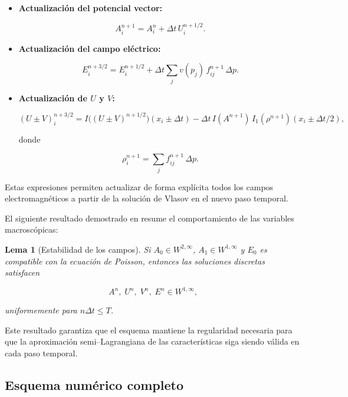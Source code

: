 \documentclass[11pt,a4paper,twoside,pdf]{article}
\numberwithin{equation}{section}
\newtheorem{lemma}[theorem]{Lema}
\begin{document}
\begin{itemize}
\item \textbf{Actualización del potencial vector:}


\[
A^{n+1}_i = A^n_i + \Delta t\,U^{n+1/2}_i.
\]



\item \textbf{Actualización del campo eléctrico:}


\[
E^{n+3/2}_i = E^{n+1/2}_i + \Delta t\sum_j v(p_j)\,f^{n+1}_{ij}\,\Delta p.
\]



\item \textbf{Actualización de $U$ y $V$:}


\[
(U\pm V)^{n+3/2}_i =
I\big((U\pm V)^{n+1/2}\big)(x_i\pm\Delta t)
-\Delta t\,I(A^{n+1})\,I_1(\rho^{n+1})(x_i\pm\Delta t/2),
\]


donde


\[
\rho^{n+1}_i = \sum_j f^{n+1}_{ij}\,\Delta p.
\]


\end{itemize}

Estas expresiones permiten actualizar de forma explícita todos los campos
electromagnéticos a partir de la solución de Vlasov en el nuevo paso temporal.


El siguiente resultado demostrado en \cite{bostan2009convergence} resume el comportamiento de las variables macroscópicas:

\begin{lemma}[Estabilidad de los campos]
Si $A_0\in W^{2,\infty}$, $A_1\in W^{1,\infty}$ y $E_0$ es compatible con la ecuación
de Poisson, entonces las soluciones discretas satisfacen


\[
A^n,\; U^n,\; V^n,\; E^n \in W^{1,\infty},
\]


uniformemente para $n\Delta t\le T$.
\end{lemma}

Este resultado garantiza que el esquema mantiene la regularidad necesaria para que
la aproximación semi--Lagrangiana de las características siga siendo válida en cada
paso temporal.

\medskip




\subsection{Esquema numérico completo}
\end{document}
